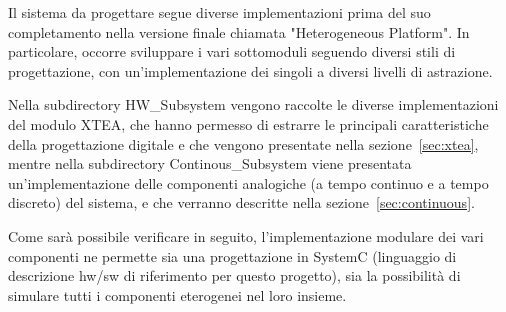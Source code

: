 \documentclass[]{IEEEtran}
\begin{document}
Il sistema da progettare segue diverse implementazioni prima del suo completamento nella versione finale chiamata 
"Heterogeneous Platform". In particolare, occorre sviluppare i vari sottomoduli seguendo diversi stili di progettazione,
con un'implementazione dei singoli a diversi livelli di astrazione.

Nella subdirectory HW\_Subsystem vengono raccolte le diverse implementazioni del modulo XTEA, che hanno permesso di estrarre
le principali caratteristiche della progettazione digitale e che vengono presentate nella sezione~\ref{sec:xtea}, mentre 
nella subdirectory Continous\_Subsystem viene presentata un'implementazione delle componenti analogiche (a tempo continuo 
e a tempo discreto) del sistema, e che verranno descritte nella sezione~\ref{sec:continuous}.

Come sar\`a possibile verificare in seguito, l'implementazione modulare dei vari componenti ne permette sia una 
progettazione in SystemC (linguaggio di descrizione hw/sw di riferimento per questo progetto), sia la possibilit\`a di 
simulare tutti i componenti eterogenei nel loro insieme.
\end{document}
